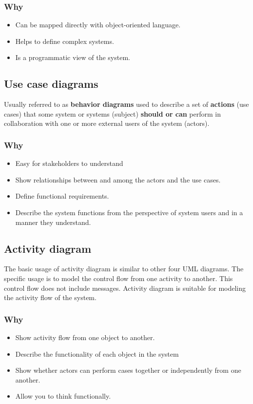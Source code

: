 \documentclass{article}
\begin{document}
\subsubsection{Why}
\begin{itemize}
	\item Can be mapped directly with object-oriented language.
	\item Helps to define complex systems.
	\item Is a programmatic view of the system.
\end{itemize}

\subsection{Use case diagrams}
\begin{flushleft}
Usually referred to as \textbf{behavior diagrams} used to describe a set of \textbf{actions} (use cases) that some system or systems (subject) \textbf{should or can} perform in collaboration with one or more external users of the system (actors).
\end{flushleft}

\subsubsection{Why}
\begin{itemize}
	\item Easy for stakeholders to understand
	\item Show relationships between and among the actors and the use cases.
	\item Define functional requirements.
	\item Describe the system functions from the perspective of system users and in a manner they understand.
\end{itemize}

\subsection{Activity diagram}
\begin{flushleft}
The basic usage of activity diagram is similar to other four UML diagrams. The specific usage is to model the control flow from one activity to another. This control flow does not include messages. Activity diagram is suitable for modeling the activity flow of the system.
\end{flushleft}

\subsubsection{Why}
\begin{itemize}
	\item Show activity flow from one object to another.
	\item Describe the functionality of each object in the system
	\item Show whether actors can perform cases together or independently from one another.
	\item Allow you to think functionally.
\end{itemize}
\end{document}
